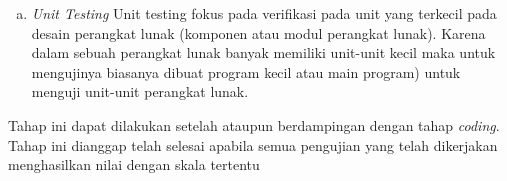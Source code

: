 \begin{enumerate}[1.]
\begin{enumerate}[a.]
			\item \textit{Unit Testing}
			\newline Unit testing fokus pada verifikasi pada unit yang terkecil pada desain perangkat lunak (komponen atau modul perangkat lunak). Karena dalam sebuah perangkat lunak banyak memiliki unit-unit kecil maka untuk mengujinya biasanya dibuat program kecil atau main program) untuk menguji unit-unit perangkat lunak.
		
	\end{enumerate}
	
	\par Tahap ini dapat dilakukan setelah ataupun berdampingan dengan tahap \textit{coding}. Tahap ini dianggap telah selesai apabila semua pengujian yang telah dikerjakan menghasilkan nilai dengan skala tertentu
	
	
\end{enumerate}

